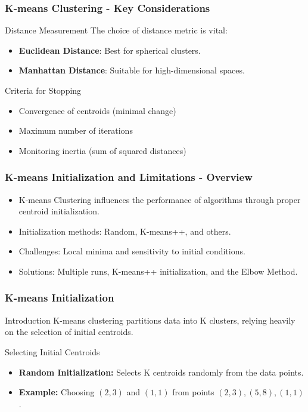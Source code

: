 \documentclass[aspectratio=169]{beamer}
\begin{document}
\begin{frame}[fragile]
    \frametitle{K-means Clustering - Key Considerations}
    \begin{block}{Distance Measurement}
        The choice of distance metric is vital:
        \begin{itemize}
            \item \textbf{Euclidean Distance}: Best for spherical clusters.
            \item \textbf{Manhattan Distance}: Suitable for high-dimensional spaces.
        \end{itemize}
    \end{block}
    \begin{block}{Criteria for Stopping}
        \begin{itemize}
            \item Convergence of centroids (minimal change)
            \item Maximum number of iterations
            \item Monitoring inertia (sum of squared distances)
        \end{itemize}
    \end{block}
\end{frame}

\begin{frame}[fragile]
    \frametitle{K-means Initialization and Limitations - Overview}
    \begin{itemize}
        \item K-means Clustering influences the performance of algorithms through proper centroid initialization.
        \item Initialization methods: Random, K-means++, and others.
        \item Challenges: Local minima and sensitivity to initial conditions.
        \item Solutions: Multiple runs, K-means++ initialization, and the Elbow Method.
    \end{itemize}
\end{frame}

\begin{frame}[fragile]
    \frametitle{K-means Initialization}
    \begin{block}{Introduction}
        K-means clustering partitions data into K clusters, relying heavily on the selection of initial centroids.
    \end{block}
    
    \begin{block}{Selecting Initial Centroids}
        \begin{itemize}
            \item \textbf{Random Initialization:} Selects K centroids randomly from the data points. 
            \item \textbf{Example:} Choosing \((2,3)\) and \((1,1)\) from points \((2,3), (5,8), (1,1)\).
        \end{itemize}
    \end{block}
\end{frame}
\end{document}
